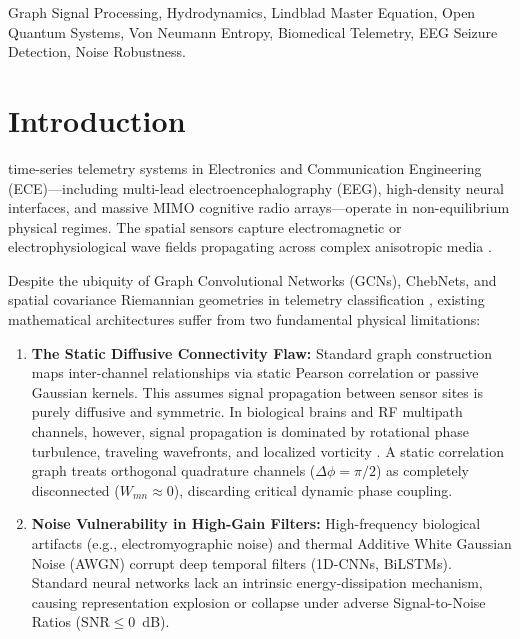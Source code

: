 \documentclass[journal,twocolumn,10pt]{IEEEtran}
\begin{document}
\begin{IEEEkeywords}
Graph Signal Processing, Hydrodynamics, Lindblad Master Equation, Open Quantum Systems, Von Neumann Entropy, Biomedical Telemetry, EEG Seizure Detection, Noise Robustness.
\end{IEEEkeywords}

\section{Introduction}
 time-series telemetry systems in Electronics and Communication Engineering (ECE)—including multi-lead electroencephalography (EEG), high-density neural interfaces, and massive MIMO cognitive radio arrays—operate in non-equilibrium physical regimes. The spatial sensors capture electromagnetic or electrophysiological wave fields propagating across complex anisotropic media \cite{shuman2013emerging,ortega2018graph}.

Despite the ubiquity of Graph Convolutional Networks (GCNs), ChebNets, and spatial covariance Riemannian geometries in telemetry classification \cite{barachant2012multiclass,yger2017riemannian,schirrmeister2017deep,oshea2017introduction}, existing mathematical architectures suffer from two fundamental physical limitations:
\begin{enumerate}
    \item \textbf{The Static Diffusive Connectivity Flaw:} Standard graph construction maps inter-channel relationships via static Pearson correlation or passive Gaussian kernels. This assumes signal propagation between sensor sites is purely diffusive and symmetric. In biological brains and RF multipath channels, however, signal propagation is dominated by rotational phase turbulence, traveling wavefronts, and localized vorticity \cite{taira2017modal,brunton2020machine}. A static correlation graph treats orthogonal quadrature channels ($\Delta \phi = \pi/2$) as completely disconnected ($W_{mn} \approx 0$), discarding critical dynamic phase coupling.
    \item \textbf{Noise Vulnerability in High-Gain Filters:} High-frequency biological artifacts (e.g., electromyographic noise) and thermal Additive White Gaussian Noise (AWGN) corrupt deep temporal filters (1D-CNNs, BiLSTMs). Standard neural networks lack an intrinsic energy-dissipation mechanism, causing representation explosion or collapse under adverse Signal-to-Noise Ratios ($\mathrm{SNR} \le 0$~dB).
\end{enumerate}
\end{document}
